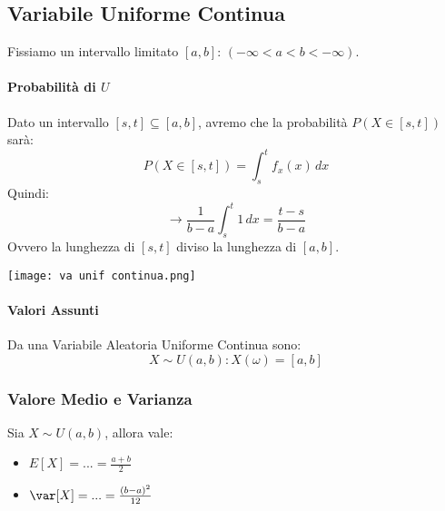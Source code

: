 \subsection{Variabile Uniforme Continua}
Fissiamo un intervallo limitato $[a, b]$: $(-\infty < a < b < -\infty)$.
\paragraph{Probabilità di $U$}
Dato un intervallo $[s, t] \subseteq [a, b]$, avremo che la probabilità $P(X \in [s,t])$ sarà:
\[
	P(X \in [s,t]) = \int_s^t f_x (x) \,dx
\]
Quindi:
\[
	\to \frac{1}{b -a} \int_s^t 1 \,dx = \frac{t-s}{b-a}
\]
Ovvero la lunghezza di $[s,t]$ diviso la lunghezza di $[a,b]$.
\begin{center}
	\texttt{[image: va unif continua.png]}
\end{center}

\paragraph{Valori Assunti} Da una Variabile Aleatoria Uniforme Continua sono:
\[
	X\sim U(a,b) : X(\omega) = [a,b]
\]

\subsubsection*{Valore Medio e Varianza}
Sia $X\sim U(a,b)$, allora vale:
\begin{itemize}
	\item $E[X] = ... = \frac{a+b}{2}$
	\item $\var[X] = ... = \frac{(b-a)^2}{12}$
\end{itemize}


